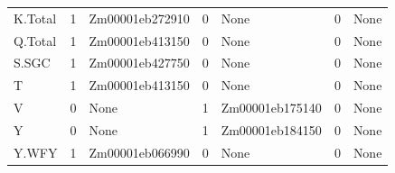 \begin{longtable}{p{1.9cm}p{0.9cm}p{4.8cm}p{0.9cm}p{4.8cm}p{0.9cm}p{3.2cm}}
K.Total & 1 & Zm00001eb272910 & 0 & None & 0 & None \\
Q.Total & 1 & Zm00001eb413150 & 0 & None & 0 & None \\
S.SGC & 1 & Zm00001eb427750 & 0 & None & 0 & None \\
T & 1 & Zm00001eb413150 & 0 & None & 0 & None \\
V & 0 & None & 1 & Zm00001eb175140 & 0 & None \\
Y & 0 & None & 1 & Zm00001eb184150 & 0 & None \\
Y.WFY & 1 & Zm00001eb066990 & 0 & None & 0 & None \\
\hline
\end{longtable}
